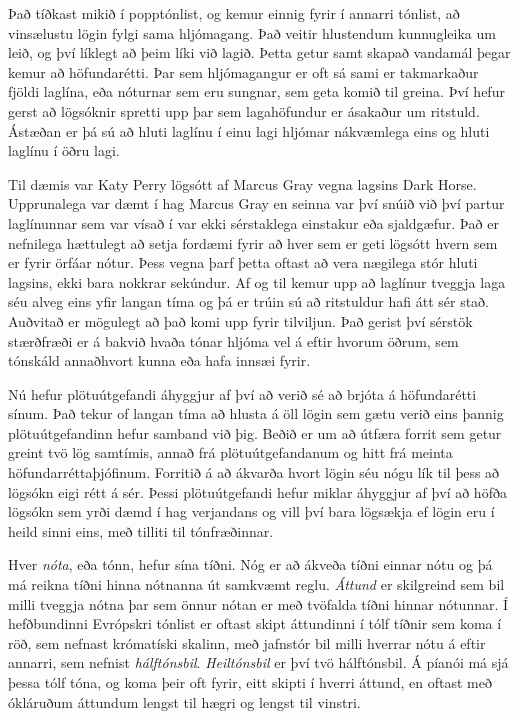 
Það tíðkast mikið í popptónlist, og kemur einnig fyrir í annarri tónlist, að vinsælustu lögin fylgi sama hljómagang.
Það veitir hlustendum kunnugleika um leið, og því líklegt að þeim líki við lagið.
Þetta getur samt skapað vandamál þegar kemur að höfundarétti.
Þar sem hljómagangur er oft sá sami er takmarkaður fjöldi laglína, eða nóturnar sem eru sungnar, sem geta komið til greina.
Því hefur gerst að lögsóknir spretti upp þar sem lagahöfundur er ásakaður um ritstuld.
Ástæðan er þá sú að hluti laglínu í einu lagi hljómar nákvæmlega eins og hluti laglínu í öðru lagi.

Til dæmis var Katy Perry lögsótt af Marcus Gray vegna lagsins Dark Horse.
Upprunalega var dæmt í hag Marcus Gray en seinna var því snúið við því partur laglínunnar sem var vísað í var ekki sérstaklega einstakur eða sjaldgæfur.
Það er nefnilega hættulegt að setja fordæmi fyrir að hver sem er geti lögsótt hvern sem er fyrir örfáar nótur.
Þess vegna þarf þetta oftast að vera nægilega stór hluti lagsins, ekki bara nokkrar sekúndur.
Af og til kemur upp að laglínur tveggja laga séu alveg eins yfir langan tíma og þá er trúin sú að ritstuldur hafi átt sér stað.
Auðvitað er mögulegt að það komi upp fyrir tilviljun. 
Það gerist því sérstök stærðfræði er á bakvið hvaða tónar hljóma vel á eftir hvorum öðrum, sem tónskáld annaðhvort kunna eða hafa innsæi fyrir.

Nú hefur plötuútgefandi áhyggjur af því að verið sé að brjóta á höfundarétti sínum.
Það tekur of langan tíma að hlusta á öll lögin sem gætu verið eins þannig plötuútgefandinn hefur samband við þig.
Beðið er um að útfæra forrit sem getur greint tvö lög samtímis, annað frá plötuútgefandanum og hitt frá meinta höfundarréttaþjófinum.
Forritið á að ákvarða hvort lögin séu nógu lík til þess að lögsókn eigi rétt á sér.
Þessi plötuútgefandi hefur miklar áhyggjur af því að höfða lögsókn sem yrði dæmd í hag verjandans og vill því bara lögsækja ef lögin eru
í heild sinni eins, með tilliti til tónfræðinnar.

Hver \emph{nóta}, eða tónn, hefur sína tíðni. Nóg er að ákveða tíðni einnar nótu og þá má reikna tíðni hinna nótnanna út samkvæmt reglu.
\emph{Áttund} er skilgreind sem bil milli tveggja nótna þar sem önnur nótan er með tvöfalda tíðni hinnar nótunnar.
Í hefðbundinni Evrópskri tónlist er oftast skipt áttundinni í tólf tíðnir sem koma í röð, sem nefnast krómatíski skalinn,
með jafnstór bil milli hverrar nótu á eftir annarri, sem nefnist \emph{hálftónsbil}.
\emph{Heiltónsbil} er því tvö hálftónsbil.
Á píanói má sjá þessa tólf tóna, og koma þeir oft fyrir, eitt skipti í hverri áttund, en oftast með ókláruðum áttundum lengst til hægri og lengst til vinstri.

